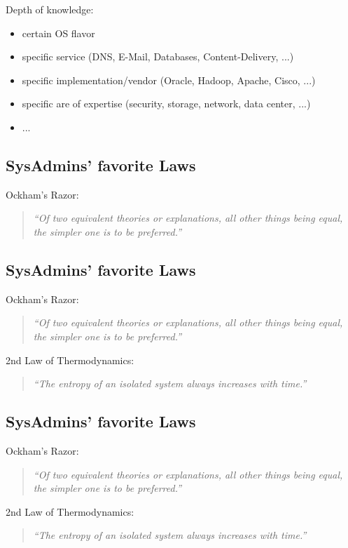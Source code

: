\documentclass[xga]{xdvislides}
\newcommand{\smallish}{\fontsize{18}{18}\selectfont}
\begin{document}
Depth of knowledge:
\begin{itemize}
	\item certain OS flavor
	\item specific service (DNS, E-Mail, Databases, Content-Delivery, ...)
	\item specific implementation/vendor (Oracle, Hadoop, Apache, Cisco, ...)
	\item specific are of expertise (security, storage, network, data center, ...)
	\item ...
\end{itemize}

\subsection{SysAdmins' favorite Laws}
\smallish
Ockham's Razor:
\begin{quote}
{\em ``Of two equivalent theories or explanations, all other things being
equal, the simpler one is to be preferred.''}
\end{quote}
\Normalsize

\subsection{SysAdmins' favorite Laws}
\smallish
Ockham's Razor:
\begin{quote}
{\em ``Of two equivalent theories or explanations, all other things being
equal, the simpler one is to be preferred.''}
\end{quote}

2nd Law of Thermodynamics:
\begin{quote}
{\em ``The entropy of an isolated system always increases with time.''}
\end{quote}
\Normalsize

\subsection{SysAdmins' favorite Laws}
\smallish
Ockham's Razor:
\begin{quote}
{\em ``Of two equivalent theories or explanations, all other things being
equal, the simpler one is to be preferred.''}
\end{quote}

2nd Law of Thermodynamics:
\begin{quote}
{\em ``The entropy of an isolated system always increases with time.''}
\end{quote}
\end{document}
